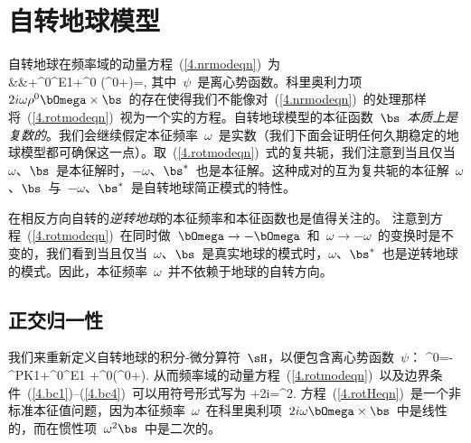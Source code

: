 \section{自转地球模型}
%
\label{4.sec.rotmod}
\renewcommand{\thesection}{\arabic{chapter}.\arabic{section}}

自转地球在频率域的动量方程~(\ref{4.nrmodeqn})~为
\eqa
\label{4.rotmodeqn}
\nonumber \\
&&\mbox{}\qquad\qquad+\rho^0\bdel\phi^{\rm E1}+\rho^0\bs\cdot\bdel\bdel
(\phi^0+\psi)=\bzero,
\ena
其中~$\psi$~是离心势函数。科里奥利力项~$2i\omega\rho^0\bOmega\times\bs$~的存在使得我们不能像对~(\ref{4.nrmodeqn})~的处理那样将~(\ref{4.rotmodeqn})~视为一个实的方程。自转地球模型的本征函数~$\bs$~{\em 本质上是复数的}。我们会继续假定本征频率~$\omega$~是实数（我们下面会证明任何久期稳定的地球模型都可确保这一点）。取~(\ref{4.rotmodeqn})~式的复共轭，我们注意到当且仅当~$\omega$、$\bs$~是本征解时，$-\omega$、$\bs^*$~也是本征解。这种成对的互为复共轭的本征解~$\omega$、$\bs$~与~$-\omega$、$\bs^*$~是自转地球简正模式的特性。

在相反方向自转的{\em 逆转地球\/}的本征频率和本征函数也是值得关注的。
%
注意到方程~(\ref{4.rotmodeqn})~在同时做~$\bOmega\rightarrow -\bOmega$~和~$\omega\rightarrow -\omega$~的变换时是不变的，我们看到当且仅当~$\omega$、$\bs$~是真实地球的模式时，$\omega$、$\bs^*$~也是逆转地球的模式。因此，本征频率~$\omega$~并不依赖于地球的自转方向。

\renewcommand{\thesubsection}{$\!\!\!\raise1.3ex\hbox{$\star$}\!\!$
\arabic{chapter}.\arabic{section}.\arabic{subsection}}
\subsection{正交归一性}
%
\label{4.sec.rotortho}
\renewcommand{\thesubsection}{\arabic{chapter}.\arabic{section}.\arabic{subsection}}

我们来重新定义自转地球的积分-微分算符~$\sH$，以便包含离心势函数~$\psi$：
%
%
\eq
\label{4.rotHdef}
\rho^0\sH\bs=-\bdel\cdot\bT^{\rm PK1}+\rho^0\bdel\phi^{\rm E1}
+\rho^0\bs\cdot\bdel\bdel(\phi^0+\psi).
\en
从而频率域的动量方程~(\ref{4.rotmodeqn})~以及边界条件~(\ref{4.bc1})--(\ref{4.bc4})~可以用符号形式写为
\eq
\label{4.rotHeqn}
\sH\bs+2i\omega\bOmega\times\bs=\omega^2\bs.
\en
方程~(\ref{4.rotHeqn})~是一个非标准本征值问题，因为本征频率~$\omega$~在科里奥利项~$2i\omega\bOmega\times\bs$~中是线性的，而在惯性项~$\omega^2\bs$~中是二次的。

